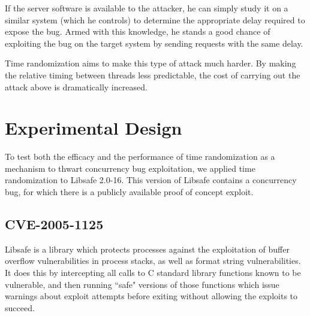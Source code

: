 \documentclass[letterpaper,twocolumn,10pt]{article}
\begin{document}
If the server software is available to the attacker, he can simply study it on a similar system (which he controls) to determine the appropriate delay required to expose the bug.  Armed with this knowledge, he stands a good chance of exploiting the bug on the target system by sending requests with the same delay.

Time randomization aims to make this type of attack much harder.  By making the relative timing between threads less predictable, the cost of carrying out the attack above is dramatically increased.

\section{Experimental Design}
To test both the efficacy and the performance of time randomization as a mechanism to thwart concurrency bug exploitation, we applied time randomization to Libsafe 2.0-16.  This version of Libsafe contains a concurrency bug, for which there is a publicly available proof of concept exploit.
\subsection{CVE-2005-1125}
Libsafe is a library which protects processes against the exploitation of buffer overflow vulnerabilities in process stacks, as well as format string vulnerabilities.  It does this by intercepting all calls to C standard library functions known to be vulnerable, and then running ``safe" versions of those functions which issue warnings about exploit attempts before exiting without allowing the exploits to succeed.
\end{document}
